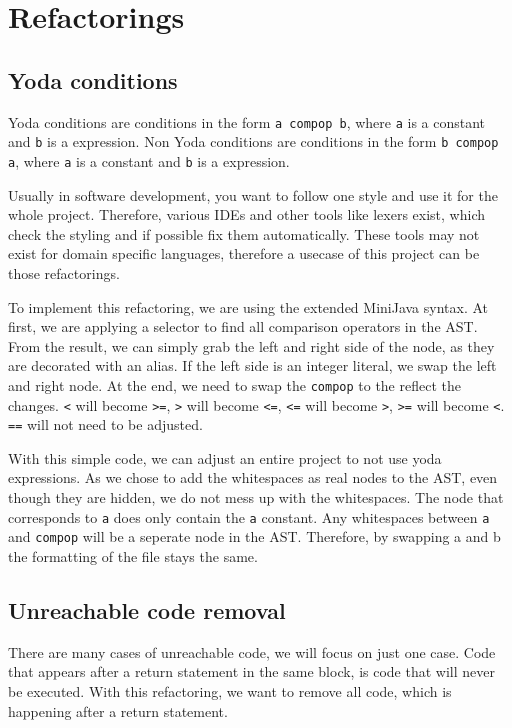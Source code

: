 \section{Refactorings}

\subsection{Yoda conditions}

Yoda conditions are conditions in the form \verb|a compop b|, where \verb|a| is a constant and \verb|b| is a expression.
Non Yoda conditions are conditions in the form \verb|b compop a|, where \verb|a| is a constant and \verb|b| is a expression.

Usually in software development, you want to follow one style and use it for the whole project. Therefore, various IDEs and other tools like lexers exist, which check
the styling and if possible fix them automatically. These tools may not exist for domain specific languages, therefore a usecase of this project can be those refactorings.

To implement this refactoring, we are using the extended MiniJava syntax. At first, we are applying a selector to find all comparison operators in the AST.
From the result, we can simply grab the left and right side of the node, as they are decorated with an alias. If the left side is an integer literal, we swap the left and right node.
At the end, we need to swap the \verb|compop| to the reflect the changes. \verb|<| will become \verb|>=|, \verb|>| will become \verb|<=|, \verb|<=| will become \verb|>|, \verb|>=| will become \verb|<|.
\verb|==| will not need to be adjusted.

With this simple code, we can adjust an entire project to not use yoda expressions. As we chose to add the whitespaces as real nodes to the AST, even though they are hidden, we do not mess up with the whitespaces.
The node that corresponds to \verb|a| does only contain the \verb|a| constant. Any whitespaces between \verb|a| and \verb|compop| will be a seperate node in the AST. Therefore, by swapping a and b the formatting
of the file stays the same.

\subsection{Unreachable code removal}

There are many cases of unreachable code, we will focus on just one case. Code that appears after a return statement in the same block, is code that will never be executed.
With this refactoring, we want to remove all code, which is happening after a return statement.

